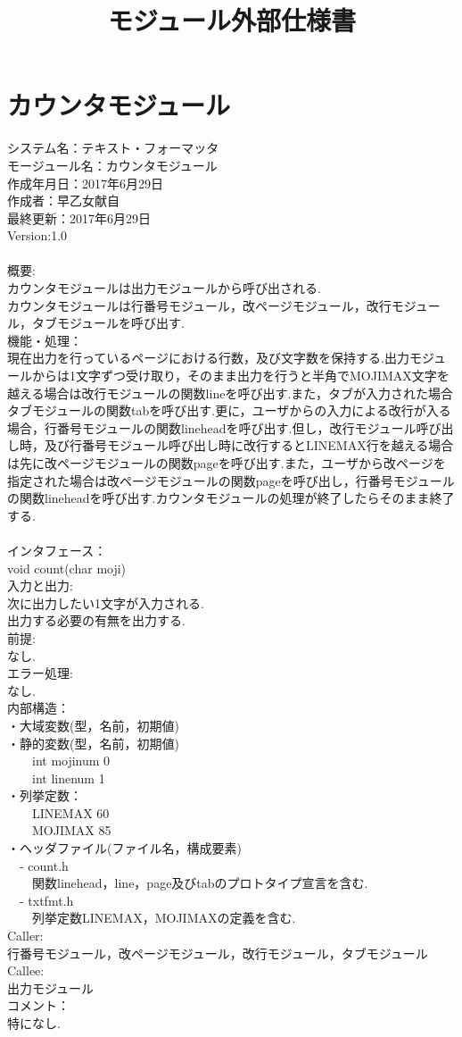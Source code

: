 \documentclass[]{jsarticle}
\title{モジュール外部仕様書}
\author{}
\date{}
\begin{document}
\maketitle
\section*{カウンタモジュール}
\noindent
システム名：テキスト・フォーマッタ\\
モージュール名：カウンタモジュール\\
作成年月日：2017年6月29日\\
作成者：早乙女献自\\
最終更新：2017年6月29日\\
Version:1.0\\
\\
概要:\\
カウンタモジュールは出力モジュールから呼び出される.\\
カウンタモジュールは行番号モジュール，改ページモジュール，改行モジュール，タブモジュールを呼び出す.
\\
機能・処理：\\
現在出力を行っているページにおける行数，及び文字数を保持する.出力モジュールからは1文字ずつ受け取り，そのまま出力を行うと半角でMOJIMAX文字を越える場合は改行モジュールの関数lineを呼び出す.また，タブが入力された場合タブモジュールの関数tabを呼び出す.更に，ユーザからの入力による改行が入る場合，行番号モジュールの関数lineheadを呼び出す.但し，改行モジュール呼び出し時，及び行番号モジュール呼び出し時に改行するとLINEMAX行を越える場合は先に改ページモジュールの関数pageを呼び出す.また，ユーザから改ページを指定された場合は改ページモジュールの関数pageを呼び出し，行番号モジュールの関数lineheadを呼び出す.カウンタモジュールの処理が終了したらそのまま終了する.\\
\\
インタフェース：\\
void count(char moji)\\
入力と出力:\\
次に出力したい1文字が入力される.\\
出力する必要の有無を出力する.\\
前提:\\
なし.\\
エラー処理:\\
なし.\\
内部構造：\\
・大域変数(型，名前，初期値)\\
・静的変数(型，名前，初期値)\\
　　int mojinum 0\\
　　int linenum 1\\
・列挙定数：\\
　　LINEMAX 60\\
　　MOJIMAX 85\\
・ヘッダファイル(ファイル名，構成要素)\\
　- count.h\\
　　関数linehead，line，page及びtabのプロトタイプ宣言を含む.\\
　- txtfmt.h\\
　　列挙定数LINEMAX，MOJIMAXの定義を含む.\\
Caller:\\
行番号モジュール，改ページモジュール，改行モジュール，タブモジュール\\
Callee:\\
出力モジュール\\
コメント：\\
特になし.
\end{document}

